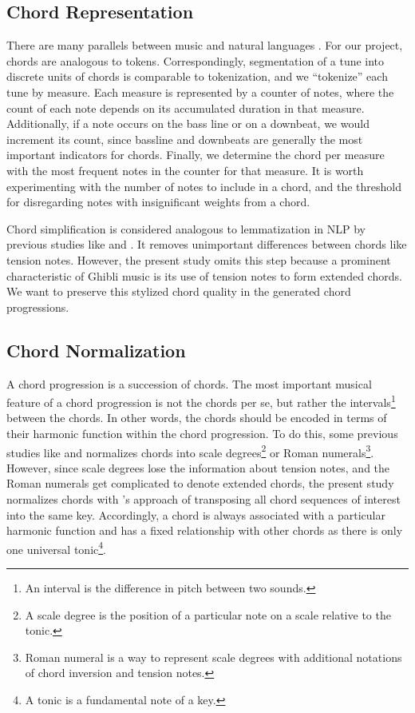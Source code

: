 \documentclass[11pt,a4paper]{article}
\begin{document}
\subsection{Chord Representation}
There are many parallels between music and natural languages \citep{ponsford1999}. For our project, chords are analogous to tokens. Correspondingly, segmentation of a tune into discrete units of chords is comparable to tokenization, and we “tokenize” each tune by measure. Each measure is represented by a counter of notes, where the count of each note depends on its accumulated duration in that measure. Additionally, if a note occurs on the bass line or on a downbeat, we would increment its count, since bassline and downbeats are generally the most important indicators for chords. Finally, we determine the chord per measure with the most frequent notes in the counter for that measure. It is worth experimenting with the number of notes to include in a chord, and the threshold for disregarding notes with insignificant weights from a chord. 
	
Chord simplification is considered analogous to lemmatization in NLP by previous studies like \citet{ogihara2008} and \citet{ponsford1999}. It removes unimportant differences between chords like tension notes. However, the present study omits this step because a prominent characteristic of Ghibli music is its use of tension notes to form extended chords. We want to preserve this stylized chord quality in the generated chord progressions.

\subsection{Chord Normalization}
A chord progression is a succession of chords. The most important musical feature of a chord progression is not the chords per se, but rather the intervals\footnote{An interval is the difference in pitch between two sounds.} between the chords. In other words, the chords should be encoded in terms of their harmonic function within the chord progression. To do this, some previous studies like \citet{whorley2007} and \citet{shukla2018} normalizes chords into scale degrees\footnote{A scale degree is the position of a particular note on a scale relative to the tonic.} or Roman numerals\footnote{Roman numeral is a way to represent scale degrees with additional notations of chord inversion and tension notes.}. However, since scale degrees lose the information about tension notes, and the Roman numerals get complicated to denote extended chords, the present study normalizes chords with \citet{ogihara2008}’s approach of transposing all chord sequences of interest into the same key. Accordingly, a chord is always associated with a particular harmonic function and has a fixed relationship with other chords as there is only one universal tonic\footnote{A tonic is a fundamental note of a key.}. 
\end{document}
